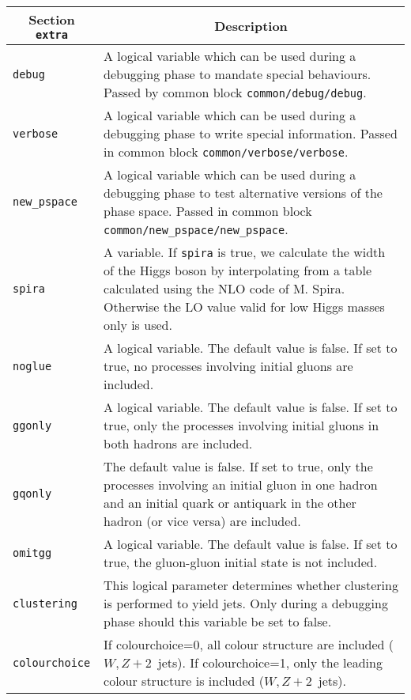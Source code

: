 	\begin{longtable}{p{1.5cm}p{12cm}}
		\toprule
		\multicolumn{1}{c}{{\textbf{Section} \texttt{extra}}} & \multicolumn{1}{c}{{\textbf{Description}}} \\ 
		\midrule
		{\tt debug} &
		A logical variable which can be used during a 
		debugging phase to mandate special behaviours. 
		Passed by common block {\tt common/debug/debug}. \\
		
		{\tt verbose} &
		A logical variable which can be used during a debugging phase to write 
		special information. Passed in common block {\tt common/verbose/verbose}. \\
		
		{\tt new\_pspace} &
		A logical variable which can be used during a debugging phase to test alternative versions of the phase space.
		Passed in common block {\tt common/new\_pspace/new\_pspace}. \\
		
		{\tt spira} & 
		A  variable. If {\tt spira} is true, we calculate the 
		width of the Higgs boson by interpolating from a table
		calculated using the NLO code of M. Spira.	Otherwise the LO value valid for low Higgs masses only is used. \\
		
		{\tt noglue} &
		A logical variable. 
		The default value is false. If set to true, no processes
		involving initial gluons are included. \\
		{\tt ggonly} &
		A logical variable. 
		The default value is false. If set to true, 
		only the processes
		involving initial gluons in both hadrons are included.\\
		{\tt gqonly} &
		The default value is false. If set to true, 
		only the processes
		involving an initial gluon in one hadron and an initial quark
		or antiquark in the other hadron (or vice versa) are included.\\
		{\tt omitgg} &
		A logical variable. 
		The default value is false. If set to true, the gluon-gluon
		initial state is not included.\\
		
		{\tt clustering} &
		This logical parameter determines whether clustering is performed to yield
		jets. Only during a debugging phase should this variable be set to false. \\
		
		{\tt colourchoice} &
		If colourchoice=0, all colour structure are included ($W,Z+2$~jets).
		If colourchoice=1, only the leading 
		colour structure is included ($W,Z+2$~jets). \\
		

\end{longtable}

